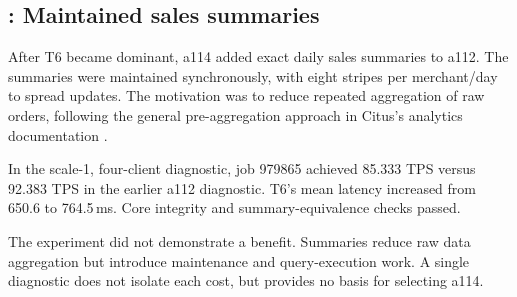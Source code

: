 \subsection{: Maintained sales summaries}
After T6 became dominant, a114 added exact daily sales summaries to a112.
The summaries were maintained synchronously, with eight stripes per merchant/day
to spread updates. The motivation was to reduce repeated aggregation of raw
orders, following the general pre-aggregation approach in Citus's analytics
documentation \citep{citus-realtime}.

In the scale-1, four-client diagnostic, job 979865 achieved 85.333 TPS versus
92.383 TPS in the earlier a112 diagnostic. T6's mean latency increased from
650.6 to 764.5\,ms. Core integrity and summary-equivalence checks passed.

The experiment did not demonstrate a benefit. Summaries reduce raw data
aggregation but introduce maintenance and query-execution work. A single
diagnostic does not isolate each cost, but provides no basis for selecting a114.
